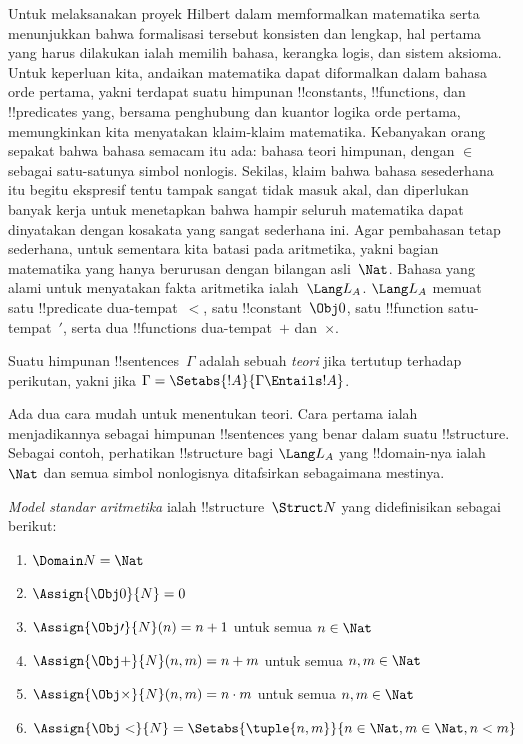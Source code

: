 \documentclass[../../../include/open-logic-section]{subfiles}
\begin{document}


Untuk melaksanakan proyek Hilbert dalam memformalkan matematika serta
menunjukkan bahwa formalisasi tersebut konsisten dan lengkap, hal pertama yang
harus dilakukan ialah memilih bahasa, kerangka logis, dan sistem aksioma.
Untuk keperluan kita, andaikan matematika dapat diformalkan dalam bahasa orde
pertama, yakni terdapat suatu himpunan !!{constant}s, !!{function}s, dan
!!{predicate}s yang, bersama penghubung dan kuantor logika orde pertama,
memungkinkan kita menyatakan klaim-klaim matematika. Kebanyakan orang sepakat
bahwa bahasa semacam itu ada: bahasa teori himpunan, dengan $\in$ sebagai
satu-satunya simbol nonlogis. Sekilas, klaim bahwa bahasa sesederhana itu
begitu ekspresif tentu tampak sangat tidak masuk akal, dan diperlukan banyak
kerja untuk menetapkan bahwa hampir seluruh matematika dapat dinyatakan dengan
kosakata yang sangat sederhana ini. Agar pembahasan tetap sederhana, untuk
sementara kita batasi pada aritmetika, yakni bagian matematika yang hanya
berurusan dengan bilangan asli~$\Nat$. Bahasa yang alami untuk menyatakan
fakta aritmetika ialah~$\Lang L_A$. $\Lang L_A$ memuat satu !!{predicate}
dua-tempat~$<$, satu !!{constant}~$\Obj 0$, satu !!{function}
satu-tempat~$\prime$, serta dua !!{function}s dua-tempat~$+$ dan~$\times$.

\begin{defn}
Suatu himpunan !!{sentence}s~$\Gamma$ adalah sebuah \emph{teori} jika tertutup
terhadap perikutan, yakni jika $\Gamma = \Setabs{!A}{\Gamma \Entails !A}$.
\end{defn}

Ada dua cara mudah untuk menentukan teori. Cara pertama ialah menjadikannya
sebagai himpunan !!{sentence}s yang benar dalam suatu !!{structure}. Sebagai
contoh, perhatikan !!{structure} bagi $\Lang L_A$ yang !!{domain}-nya
ialah~$\Nat$ dan semua simbol nonlogisnya ditafsirkan sebagaimana mestinya.

\begin{defn}
\emph{Model standar aritmetika} ialah !!{structure}~$\Struct N$ yang
didefinisikan sebagai berikut:
\begin{enumerate}
\item $\Domain N = \Nat$
\item $\Assign{\Obj 0}{N} = 0$
\item $\Assign{\Obj \prime}{N}(n) = n + 1$ untuk semua $n \in \Nat$
\item $\Assign{\Obj +}{N}(n, m) = n + m$ untuk semua $n, m \in \Nat$
\item $\Assign{\Obj \times}{N}(n, m) = n\cdot m$ untuk semua $n, m \in \Nat$
\item $\Assign{\Obj <}{N} = \Setabs{\tuple{n, m}}{n \in \Nat, m \in
  \Nat, n < m}$
\end{enumerate}
\end{defn}
\end{document}
